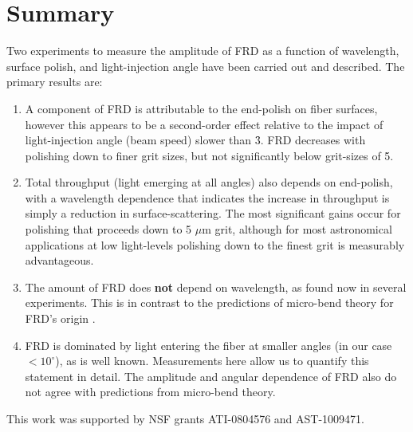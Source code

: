 \section{Summary}
\label{FRD:sec:summary}
Two experiments to 
measure the
amplitude of FRD as a function of wavelength, surface polish, 
and light-injection angle have been carried out and described.
The primary results are:
\begin{enumerate}

\item A component of FRD is attributable to the end-polish
  on fiber surfaces, however this appears to be a second-order effect
  relative to the impact of light-injection angle (beam speed) slower
  than \f3. FRD decreases with polishing down to finer grit sizes, but
  not significantly below grit-sizes of 5\mum.

\item Total throughput (light emerging at all angles) also depends on
  end-polish, with a wavelength dependence that indicates the increase
  in throughput is simply a reduction in surface-scattering.  The most
  significant gains occur for polishing that proceeds down to 5 $\mu$m
  grit, although for most astronomical applications at low
  light-levels polishing down to the finest grit is measurably
  advantageous.

\item The amount of FRD does \textbf{not} depend on wavelength, as found now
  in several experiments. This is in contrast to the predictions of micro-bend
  theory for FRD's origin \citep{Carrasco}.

\item FRD is dominated by light entering the fiber at smaller angles
  (in our case $<10^{\circ}$), as is well known. Measurements here
  allow us to quantify this statement in detail. The amplitude and
  angular dependence of FRD also do not agree with predictions from
  micro-bend theory.

\end{enumerate}

This work was supported by NSF grants ATI-0804576 and AST-1009471.



